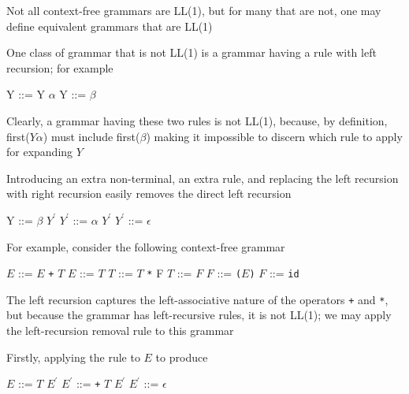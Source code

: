 \documentclass[8pt,a4paper,compress]{beamer}
\newcommand{\mm}[1]{$#1$}
\newcommand{\expo}[2]{$#1^{#2}$}
\newenvironment{spaced}
{
\smallskip
\hspace{.5cm}
\begin{minipage}[c]{\textwidth}
}
{
\end{minipage}
\smallskip
}
\begin{document}
\begin{frame}[fragile]
\pause

Not all context-free grammars are LL(1), but for many that are not, one may define equivalent grammars that are LL(1)

\pause
\bigskip

One class of grammar that is not LL(1) is a grammar having a rule with left recursion; for example 

\text{ }
\begin{spaced}
\begin{production}
Y ::= Y \mm{\alpha}
Y ::= \mm{\beta}
\end{production}
\end{spaced}

\pause

Clearly, a grammar having these two rules is not LL(1), because, by definition, first($Y \alpha$) must include first($\beta$) making it impossible to discern which rule to apply for expanding $Y$

\pause
\bigskip

Introducing an extra non-terminal, an extra rule, and replacing the left recursion with right recursion easily removes the direct left recursion

\text{ }
\begin{spaced}
\begin{production}
Y  ::= \mm{\beta} \expo{Y}{\prime}
\expo{Y}{\prime} ::= \mm{\alpha} \expo{Y}{\prime}
\expo{Y}{\prime} ::= \mm{\epsilon}
\end{production}
\end{spaced}
\end{frame}

\begin{frame}[fragile]
\pause

For example, consider the following context-free grammar

\text{ }
\begin{spaced}
\begin{production}
\mm{E} ::= \mm{E} \lstinline{+} \mm{T}
\mm{E} ::= \mm{T}
\mm{T} ::= \mm{T}  \lstinline{*} {F}
\mm{T} ::= \mm{F}
\mm{F} ::= \lstinline{(}\mm{E}\lstinline{)}
\mm{F} ::= \lstinline{id}
\end{production}
\end{spaced}

\pause

The left recursion captures the left-associative nature of the operators \lstinline{+} and \lstinline{*}, but because the grammar has left-recursive rules, it is not LL(1); we may apply the left-recursion removal rule to this grammar

\pause
\bigskip

Firstly, applying the rule to $E$ to produce

\text{ }
\begin{spaced}
\begin{production}
\mm{E}  ::= \mm{T} \expo{E}{\prime}
\expo{E}{\prime} ::= \lstinline{+} \mm{T} \expo{E}{\prime}
\expo{E}{\prime} ::= \mm{\epsilon}
\end{production}
\end{spaced}
\end{frame}
\end{document}
